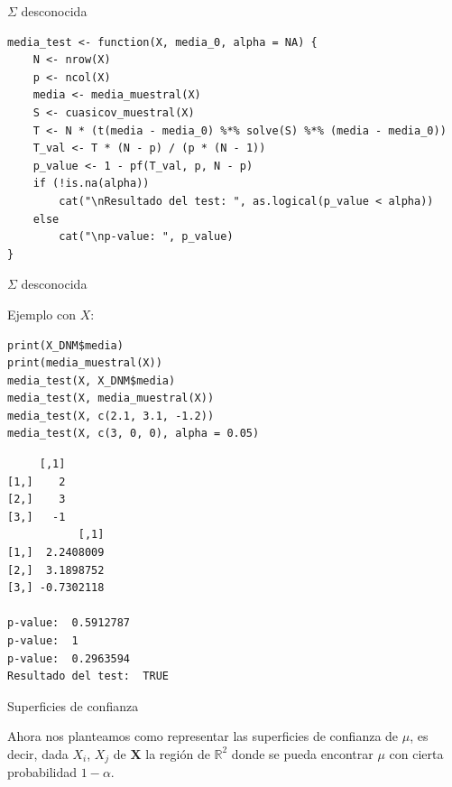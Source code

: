 \documentclass[xcolor=table]{beamer}
\begin{document}
\begin{frame}[fragile]{$\Sigma$ desconocida}

\begin{lstlisting}
media_test <- function(X, media_0, alpha = NA) {
    N <- nrow(X)
    p <- ncol(X)
    media <- media_muestral(X)
    S <- cuasicov_muestral(X)
    T <- N * (t(media - media_0) %*% solve(S) %*% (media - media_0))
    T_val <- T * (N - p) / (p * (N - 1))
    p_value <- 1 - pf(T_val, p, N - p)
    if (!is.na(alpha))
        cat("\nResultado del test: ", as.logical(p_value < alpha))
    else
        cat("\np-value: ", p_value)
}
\end{lstlisting}

\end{frame}


\begin{frame}[fragile]{$\Sigma$ desconocida}

Ejemplo con $X$:

\begin{lstlisting}
print(X_DNM$media)
print(media_muestral(X))
media_test(X, X_DNM$media)
media_test(X, media_muestral(X))
media_test(X, c(2.1, 3.1, -1.2))
media_test(X, c(3, 0, 0), alpha = 0.05)
\end{lstlisting}

\begin{lstlisting}
     [,1]
[1,]    2
[2,]    3
[3,]   -1
           [,1]
[1,]  2.2408009
[2,]  3.1898752
[3,] -0.7302118

p-value:  0.5912787
p-value:  1
p-value:  0.2963594
Resultado del test:  TRUE
\end{lstlisting}

\end{frame}


\begin{frame}[fragile]{Superficies de confianza}

Ahora nos planteamos como representar las superficies de confianza de $\mu$, es decir, dada $X_i$, $X_j$ de $\pmb{X}$ la región de $\mathbb{R}^2$ donde se pueda encontrar $\mu$ con cierta probabilidad $1 - \alpha$.

\end{frame}
\end{document}
